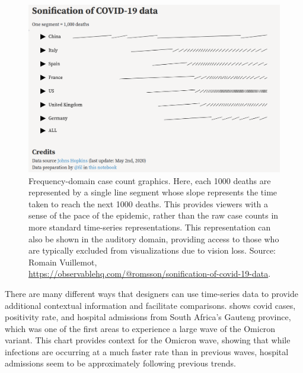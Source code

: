 \documentclass[article]{jdssv}\usepackage[]{graphicx}\usepackage[]{color}
\begin{document}
\begin{figure}
\centering
\includegraphics[width=.75\linewidth]{frequency-domain}
\caption{Frequency-domain case count graphics. Here, each 1000 deaths are represented by a single line segment whose slope represents the time taken to reach the next 1000 deaths. This provides viewers with a sense of the pace of the epidemic, rather than the raw case counts in more standard time-series representations. This representation can also be shown in the auditory domain, providing access to those who are typically excluded from visualizations due to vision loss. Source: Romain Vuillemot, \url{https://observablehq.com/@romsson/sonification-of-covid-19-data}.}
\label{fig:freq-domain}
\end{figure}

There are many different ways that designers can use time-series data to provide additional contextual information and facilitate comparisons.  shows covid cases, positivity rate, and hospital admissions from South Africa's Gauteng province, which was one of the first areas to experience a large wave of the Omicron variant. This chart provides context for the Omicron wave, showing that while infections are occurring at a much faster rate than in previous waves, hospital admissions seem to be approximately following previous trends. 
\end{document}

